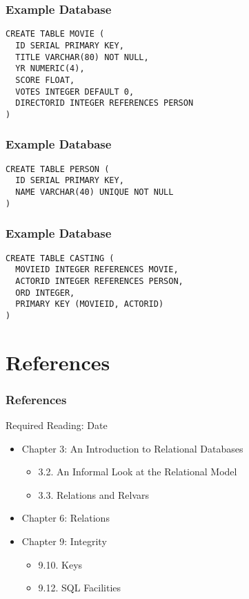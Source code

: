 \documentclass[dvipsnames]{beamer}
\theoremstyle{plain}
\begin{document}
\begin{frame}[fragile]
  \frametitle{Example Database}

  \begin{lstlisting}
CREATE TABLE MOVIE (
  ID SERIAL PRIMARY KEY,
  TITLE VARCHAR(80) NOT NULL,
  YR NUMERIC(4),
  SCORE FLOAT,
  VOTES INTEGER DEFAULT 0,
  DIRECTORID INTEGER REFERENCES PERSON
)
  \end{lstlisting}
\end{frame}

\begin{frame}[fragile]
  \frametitle{Example Database}

  \begin{lstlisting}
CREATE TABLE PERSON (
  ID SERIAL PRIMARY KEY,
  NAME VARCHAR(40) UNIQUE NOT NULL
)
  \end{lstlisting}
\end{frame}

\begin{frame}[fragile]
  \frametitle{Example Database}

  \begin{lstlisting}
CREATE TABLE CASTING (
  MOVIEID INTEGER REFERENCES MOVIE,
  ACTORID INTEGER REFERENCES PERSON,
  ORD INTEGER,
  PRIMARY KEY (MOVIEID, ACTORID)
)
  \end{lstlisting}
\end{frame}

\section*{References}

\begin{frame}
  \frametitle{References}

  \begin{block}{Required Reading: Date}
    \begin{itemize}
      \item Chapter 3: An Introduction to Relational Databases
      \begin{itemize}
        \item 3.2. \alert{An Informal Look at the Relational Model}
        \item 3.3. \alert{Relations and Relvars}
      \end{itemize}

      \item Chapter 6: \alert{Relations}

      \item Chapter 9: Integrity
      \begin{itemize}
        \item 9.10. \alert{Keys}
        \item 9.12. \alert{SQL Facilities}
      \end{itemize}
    \end{itemize}
  \end{block}
\end{frame}
\end{document}
